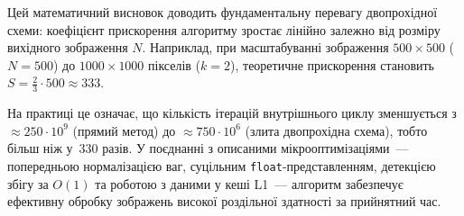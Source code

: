 Цей математичний висновок доводить фундаментальну перевагу двопрохідної
схеми: коефіцієнт прискорення алгоритму зростає лінійно залежно від
розміру вихідного зображення $N$. Наприклад, при масштабуванні зображення
$500 \times 500$ ($N=500$) до $1000 \times 1000$ пікселів ($k=2$),
теоретичне прискорення становить $S = \frac{2}{3} \cdot 500 \approx 333$.

На практиці це означає, що кількість ітерацій внутрішнього циклу
зменшується з $\approx 250 \cdot 10^9$ (прямий метод) до
$\approx 750 \cdot 10^6$ (злита двопрохідна схема), тобто більш ніж
у~$330$ разів. У поєднанні з описаними мікрооптимізаціями~--- попередньою
нормалізацією ваг, суцільним \texttt{float}-представленням, детекцією
збігу за $O(1)$ та роботою з даними у кеші L1~--- алгоритм забезпечує
ефективну обробку зображень високої роздільної здатності за прийнятний
час.